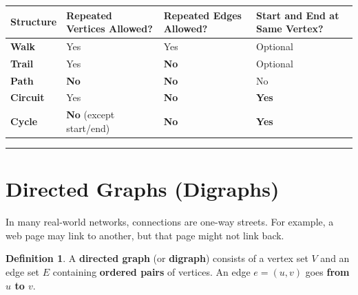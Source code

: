 \documentclass[
]{book}
\newcounter{none} %
\theoremstyle{definition}
\newtheorem{definition}{Definition}[chapter]
\theoremstyle{definition}
\theoremstyle{definition}
\theoremstyle{definition}
\theoremstyle{remark}
\begin{document}
{\def\LTcaptype{none} %
\begin{longtable}[]{@{}
  >{\raggedright\arraybackslash}p{}
  >{\raggedright\arraybackslash}p{}
  >{\raggedright\arraybackslash}p{}
  >{\raggedright\arraybackslash}p{}@{}}
\toprule\noalign{}
\begin{minipage}[b]{\linewidth}\raggedright
Structure
\end{minipage} & \begin{minipage}[b]{\linewidth}\raggedright
Repeated Vertices Allowed?
\end{minipage} & \begin{minipage}[b]{\linewidth}\raggedright
Repeated Edges Allowed?
\end{minipage} & \begin{minipage}[b]{\linewidth}\raggedright
Start and End at Same Vertex?
\end{minipage} \\
\midrule\noalign{}
\endhead
\bottomrule\noalign{}
\endlastfoot
\textbf{Walk} & Yes & Yes & Optional \\
\textbf{Trail} & Yes & \textbf{No} & Optional \\
\textbf{Path} & \textbf{No} & \textbf{No} & No \\
\textbf{Circuit} & Yes & \textbf{No} & \textbf{Yes} \\
\textbf{Cycle} & \textbf{No} (except start/end) & \textbf{No} & \textbf{Yes} \\
\end{longtable}
}

\begin{center}\rule{0.5\linewidth}{0.5pt}\end{center}

\section{Directed Graphs (Digraphs)}\label{directed-graphs-digraphs}

In many real-world networks, connections are one-way streets. For example, a web page may link to another, but that page might not link back.

\begin{definition}
\protect\hypertarget{def:unnamed-chunk-12}{}\label{def:unnamed-chunk-12}A \textbf{directed graph} (or \textbf{digraph}) consists of a vertex set \(V\) and an edge set \(E\) containing \textbf{ordered pairs} of vertices. An edge \(e = (u, v)\) goes \textbf{from \(u\) to \(v\)}.
\end{definition}
\end{document}
